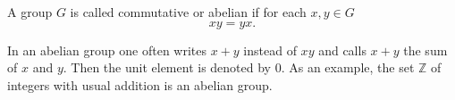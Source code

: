 A group $G$ is called commutative or abelian if for each $x, y \in G$
$$xy = yx.$$

In an abelian group one often writes $x + y$ instead of $xy$ and calls $x + y$ the sum of $x$ and $y$. Then the unit element is denoted by $0$. As an example, the set $\mathbb{Z}$ of integers with usual addition is an abelian group.
